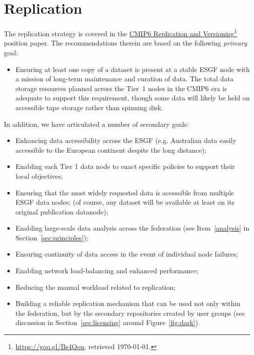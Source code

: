 \documentclass[gmd,manuscript]{copernicus}
\newcommand{\urlref}[2] {\href{#1}{#2}\footnote{\url{#1}, retrieved \today.}}
\begin{document}
\section{Replication}
\label{sec:replica}

The replication strategy is covered in the
\urlref{https://goo.gl/Bs4Qou}{CMIP6 Replication and Versioning}
position paper. The recommendations therein are based on the following
\emph{primary} goal:

\begin{itemize}
\item Ensuring at least one copy of a dataset is present at a stable
  ESGF node with a mission of long-term maintenance and curation of
  data. The total data storage resources planned across the Tier~1
  nodes in the CMIP6 era is adequate to support this requirement,
  though some data will likely be held on accessible tape storage
  rather than spinning disk.
\end{itemize}

In addition, we have articulated a number of secondary goals:

\begin{itemize}
\item Enhancing data accessibility across the ESGF (e.g. Australian
  data easily accessible to the European continent despite the long
  distance);
\item Enabling each Tier 1 data node to enact specific policies to
  support their local objectives;
\item Ensuring that the most widely requested data is 
  accessible from multiple ESGF data nodes;
  (of course, any dataset will be available at least on its original
  publication datanode);
\item Enabling large-scale data analysis across the federation (see
  Item~\ref{analysis} in Section~\ref{sec:principles});
\item Ensuring continuity of data access in the event of individual
  node failures;
\item Enabling network load-balancing and enhanced performance;
\item Reducing the manual workload related to replication;
\item Building a reliable replication mechanism that can be used not
  only within the federation, but by the secondary repositories
  created by user groups (see discussion in
  Section~\ref{sec:licensing} around Figure~\ref{fig:dark}).
\end{itemize}
\end{document}
